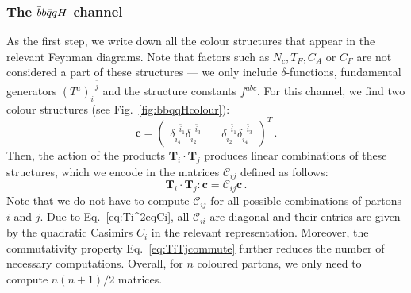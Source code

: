 \documentclass[main.tex]{subfiles}
\begin{document}
\subsubsection{The $\bar{b}b\bar{q}qH$ channel}
As the first step, we write down all the colour structures that appear in the relevant Feynman diagrams. Note that factors such as $N_c, T_F, C_A$ or $C_F$ are not considered a part of these structures --- we only include $\delta$-functions, fundamental generators $(T^a)_i^{\;\;\bar{j}}$ and the structure constants $f^{abc}$. For this channel, we find two colour structures (see Fig.~\ref{fig:bbqqHcolour}):
\begin{equation}
    \bm{c} = 
    \begin{pmatrix}
        \delta_{i_4}^{\;\;\bar{i}_1} \delta_{i_2}^{\;\;\bar{i}_3} & \quad \delta_{i_2}^{\;\;\bar{i}_1} \delta_{i_4}^{\;\;\bar{i}_3}
    \end{pmatrix}^T\,.
\end{equation}
Then, the action of the products $\bm{T}_i \cdot \bm{T}_j$ produces linear combinations of these structures, which we encode in the matrices $\mathcal{C}_{ij}$ defined as follows:
\begin{equation}
    \bm{T}_i \cdot \bm{T}_j :  \bm{c} = \mathcal{C}_{ij} \bm{c}\,.
\end{equation}
Note that we do not have to compute $\mathcal{C}_{ij}$ for all possible combinations of partons $i$ and $j$. Due to Eq.~\ref{eq:Ti^2eqCi}, all $\mathcal{C}_{ii}$ are diagonal and their entries are given by the quadratic Casimirs $C_i$ in the relevant representation. Moreover, the commutativity property Eq.~\ref{eq:TiTjcommute} further reduces the number of necessary computations. Overall, for $n$ coloured partons, we only need to compute $n(n+1)/2$ matrices.
\end{document}
